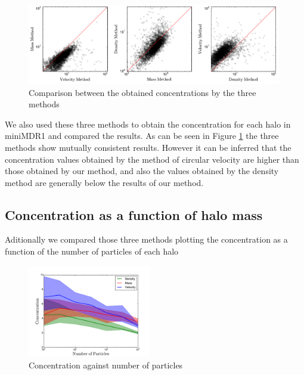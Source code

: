 \documentclass[useAMS,usenatbib]{mn2e}
\begin{document}
\begin{figure}
\begin{center}
  \includegraphics[width=0.99\textwidth]{mass-density-velocity.pdf}
\end{center}
\caption{Comparison between the obtained concentrations by the three methods
    \label{fig:mdv}}
\end{figure}

We also used these three methods to obtain the concentration for each halo in miniMDR1 and compared the results. As can be seen in Figure \ref{fig:mdv} the three methods show mutually consistent results. However it can be inferred that the concentration values ​​obtained by the method of circular velocity are higher than those obtained by our method, and also the values ​​obtained by the density method are generally below the results of our method.

\subsection{Concentration as a function of halo mass}
Aditionally we compared those three methods plotting the concentration as a function of the number of particles of each halo 

\begin{figure}[h!]
\begin{center}
  \includegraphics[width=0.48\textwidth]{concentration.pdf}
\end{center}
\caption{Concentration against number of particles
    \label{fig:concentrations}}
\end{figure}
\end{document}
